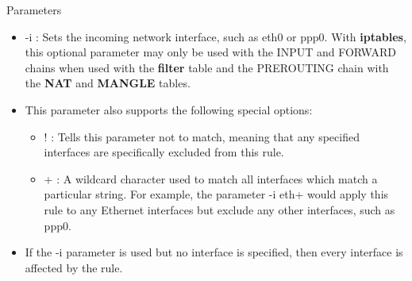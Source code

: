 \begin{frame}[t]{Parameters}
  \fontsize{14}{16}\selectfont
  \begin{itemize}
    \item {\ttfamily -i} : Sets the incoming network interface, such as eth0 or ppp0. With \textcolor{CommandGreen}{\bfseries iptables}, this optional parameter may only be used with the INPUT and FORWARD chains when used with the \textcolor{CommandGreen}{\bfseries filter} table and the PREROUTING chain with the \textcolor{CommandGreen}{\bfseries NAT} and \textcolor{CommandGreen}{\bfseries MANGLE} tables.
    \item This parameter also supports the following special options:
    \begin{itemize}
      \item {\ttfamily !} : Tells this parameter not to match, meaning that any specified interfaces are specifically excluded from this rule.
      \item {\ttfamily +} : A wildcard character used to match all interfaces which match a particular string. For example, the parameter {\ttfamily -i eth+} would apply this rule to any Ethernet interfaces but exclude any other interfaces, such as ppp0.
    \end{itemize}
    \item If the {\ttfamily -i} parameter is used but no interface is specified, then every interface is affected by the rule.
  \end{itemize}
\end{frame}
